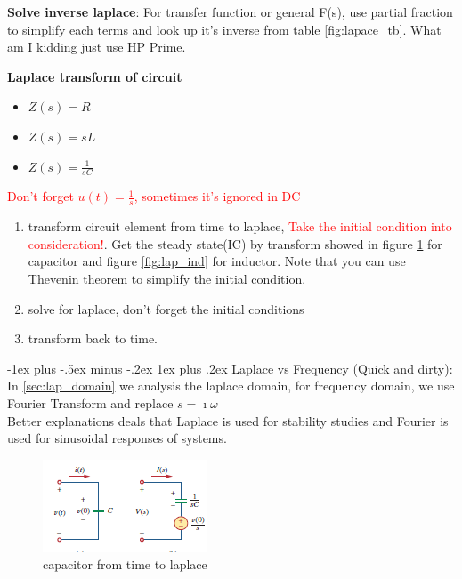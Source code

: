 \documentclass[10pt,landscape]{article}
\makeatletter
\renewcommand{\subsubsection}{\@startsection{subsubsection}{3}{0mm}%
                                {-1ex plus -.5ex minus -.2ex}%
                                {1ex plus .2ex}%
                                {\normalfont\small\bfseries}}
\newcommand\todo[1]{\textcolor{red}{#1}}
\theoremstyle{definition}
\theoremstyle{remark}
\makeatother
\begin{document}
\begin{multicols}{3}
\textbf{Solve inverse laplace}: For transfer function or general F(s), use partial fraction to simplify each terms and look up it's inverse from table \ref{fig:lapace_tb}. What am I kidding just use HP Prime. 

\textbf{Laplace transform of circuit} \label{sec:lap_domain}
\begin{itemize}[noitemsep,nolistsep]
    \item $Z(s) = R$
    \item $Z(s) = sL$
    \item $Z(s) = \frac{1}{sC}$
\end{itemize}
\todo{Don't forget $u(t) = \frac{1}{s}$, sometimes it's ignored in DC}

\begin{enumerate}
    \item transform circuit element from time to laplace, \todo{Take the initial condition into consideration!}. Get the steady state(IC) by transform showed in figure \ref{fig:lap_cap} for capacitor and figure \ref{fig:lap_ind} for inductor. Note that you can use Thevenin theorem to simplify the initial condition.
    \item solve for laplace, don't forget the initial conditions
    \item transform back to time. 
\end{enumerate}

\subsubsection{Laplace vs Frequency}
(Quick and dirty): In \ref{sec:lap_domain} we analysis the laplace domain, for frequency domain, we use Fourier Transform and replace $s = \imath \omega$ \\
Better explanations deals that Laplace is used for stability studies and Fourier is used for sinusoidal responses of systems. 

\begin{figure}[H]
    \centering
    \includegraphics[width=0.8\linewidth]{202/figure/laplace_cap.png}
    \caption{capacitor from time to laplace}
    \label{fig:lap_cap}
\end{figure}


\end{multicols}
\end{document}
